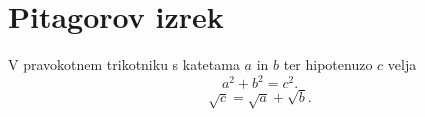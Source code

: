 \documentclass{article}
\begin{document}
\section*{Pitagorov izrek}
V pravokotnem trikotniku s katetama \(a\) in \(b\) ter hipotenuzo \(c\) velja
\[ a^2 + b^2 = c^2 .\]
\[\sqrt{c} = \sqrt{a}  + \sqrt{b} .\]
\end{document}
